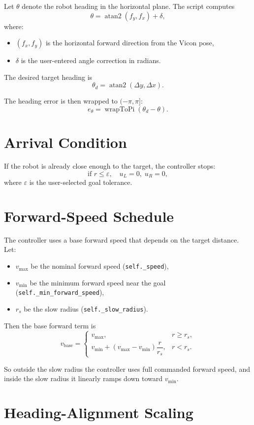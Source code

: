 \documentclass[11pt]{article}
\begin{document}
Let $\theta$ denote the robot heading in the horizontal plane. The script
computes
\[
\theta = \operatorname{atan2}(f_y, f_x) + \delta,
\]
where:
\begin{itemize}
\item $(f_x, f_y)$ is the horizontal forward direction from the Vicon pose,
\item $\delta$ is the user-entered angle correction in radians.
\end{itemize}

The desired target heading is
\[
\theta_d = \operatorname{atan2}(\Delta y, \Delta x).
\]

The heading error is then wrapped to $(-\pi, \pi]$:
\[
e_\theta = \operatorname{wrapToPi}(\theta_d - \theta).
\]

\section{Arrival Condition}

If the robot is already close enough to the target, the controller stops:
\[
\text{if } r \le \varepsilon, \quad u_L = 0,\; u_R = 0,
\]
where $\varepsilon$ is the user-selected goal tolerance.

\section{Forward-Speed Schedule}

The controller uses a base forward speed that depends on the target distance.
Let:
\begin{itemize}
\item $v_{\max}$ be the nominal forward speed (\texttt{self.\_speed}),
\item $v_{\min}$ be the minimum forward speed near the goal
(\texttt{self.\_min\_forward\_speed}),
\item $r_s$ be the slow radius (\texttt{self.\_slow\_radius}).
\end{itemize}

Then the base forward term is
\[
v_{\text{base}} =
\begin{cases}
v_{\max}, & r \ge r_s, \\
v_{\min} + (v_{\max} - v_{\min}) \dfrac{r}{r_s}, & r < r_s.
\end{cases}
\]

So outside the slow radius the controller uses full commanded forward speed,
and inside the slow radius it linearly ramps down toward $v_{\min}$.

\section{Heading-Alignment Scaling}
\end{document}

